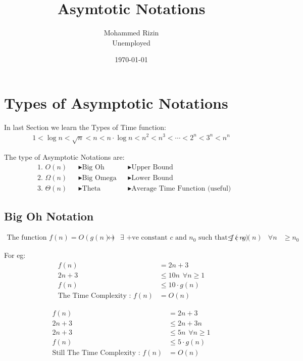 \documentclass[]{article}
\title{Asymtotic Notations}
\author{Mohammed Rizin \\ Unemployed}
\date{\today}
\begin{document}
\maketitle

\section{Types of Asymptotic Notations}

In last Section we learn the Types of Time function:
\[
\boxed{
\begin{aligned}
    1 < \log{n} < \sqrt{n} < n < n\cdot \log{n} < n^2 < n^3 < \cdots < 2^n <  3^n < n^n
\end{aligned}
}
\]

The type of Asymptotic Notations are:
\[
\begin{aligned}
    &\text{1. } O(n) &&\blacktriangleright \text{Big Oh} &&\blacktriangleright \text{Upper Bound} \\
    &\text{2. } \Omega(n) &&\blacktriangleright \text{Big Omega} &&\blacktriangleright \text{Lower Bound} \\
    &\text{3. } \Theta(n) &&\blacktriangleright \text{Theta} &&\blacktriangleright \text{Average Time Function (useful)}
\end{aligned}
\]

\subsection{Big Oh Notation}
\[
\begin{aligned}
        \text{The function } f(n) = O{(g(n))} &\leftrightarrow &\exists \text{ +ve constant $c$ and } 
        n_0 \text{ such that } f{(n)} &\leq c \cdot g{(n)} &\forall n &\geq n_0  
\end{aligned}
\]

For eg:
\[
\begin{aligned}
        f(n) &= 2n + 3 \\
        2n+3 &\leq 10n \hspace{5pt} \forall n \geq 1 \\
        f(n) &\leq 10 \cdot g(n) \\
        \text{The Time Complexity : } f(n) &= O(n)
\end{aligned}
\]

\[
\begin{aligned}
        f(n) &= 2n + 3 \\
        2n+3 &\leq 2n + 3n \\
        2n+3 &\leq 5n \hspace{5pt} \forall n \geq 1 \\
        f(n) &\leq 5 \cdot g(n) \\
        \text{Still The Time Complexity : } f(n) &= O(n)
\end{aligned}
\]
\end{document}
